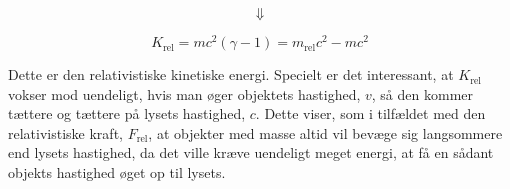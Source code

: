 $$\Downarrow$$

\begin{equation}
K_{\text{rel}} = m c^2 \left( \gamma - 1 \right) = m_{\text{rel}}c^2 - mc^2 
\end{equation}

\vspace{2mm}

Dette er den relativistiske kinetiske energi. Specielt er det interessant, at $K_{\text{rel}}$ vokser mod uendeligt, hvis man øger objektets hastighed, $v$, så den kommer tættere og tættere på lysets hastighed, $c$. Dette viser, som i tilfældet med den relativistiske kraft, $F_{\text{rel}}$, at objekter med masse altid vil bevæge sig langsommere end lysets hastighed, da det ville kræve uendeligt meget energi, at få en sådant objekts hastighed øget op til lysets.\\